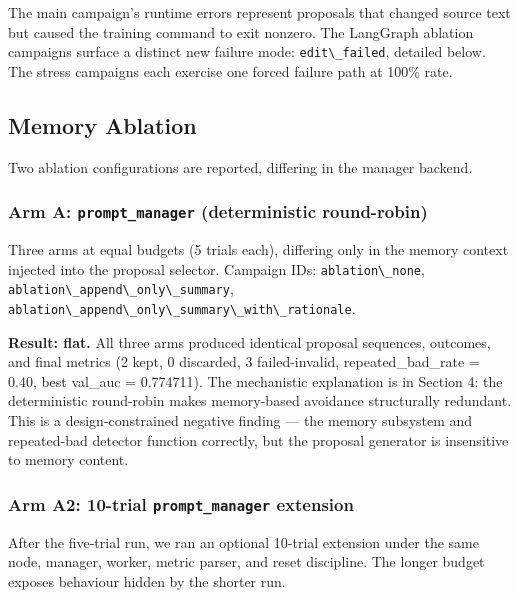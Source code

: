 The main campaign's runtime errors represent proposals that changed source text but caused the training command to exit nonzero. The LangGraph ablation campaigns surface a distinct new failure mode: \passthrough{\lstinline!edit\_failed!}, detailed below. The stress campaigns each exercise one forced failure path at 100\% rate.

\subsection{Memory Ablation}\label{memory-ablation}

Two ablation configurations are reported, differing in the manager backend.

\subsubsection{\texorpdfstring{Arm A: \texttt{prompt\_manager} (deterministic round-robin)}{Arm A: prompt\_manager (deterministic round-robin)}}\label{arm-a-prompt_manager-deterministic-round-robin}

Three arms at equal budgets (5 trials each), differing only in the memory context injected into the proposal selector. Campaign IDs: \passthrough{\lstinline!ablation\_none!}, \passthrough{\lstinline!ablation\_append\_only\_summary!}, \passthrough{\lstinline!ablation\_append\_only\_summary\_with\_rationale!}.

\textbf{Result: flat.} All three arms produced identical proposal sequences, outcomes, and final metrics (2 kept, 0 discarded, 3 failed-invalid, repeated\_bad\_rate = 0.40, best val\_auc = 0.774711). The mechanistic explanation is in Section 4: the deterministic round-robin makes memory-based avoidance structurally redundant. This is a design-constrained negative finding --- the memory subsystem and repeated-bad detector function correctly, but the proposal generator is insensitive to memory content.

\subsubsection{\texorpdfstring{Arm A2: 10-trial \texttt{prompt\_manager} extension}{Arm A2: 10-trial prompt\_manager extension}}\label{arm-a2-10-trial-prompt_manager-extension}

After the five-trial run, we ran an optional 10-trial extension under the same node, manager, worker, metric parser, and reset discipline. The longer budget exposes behaviour hidden by the shorter run.

